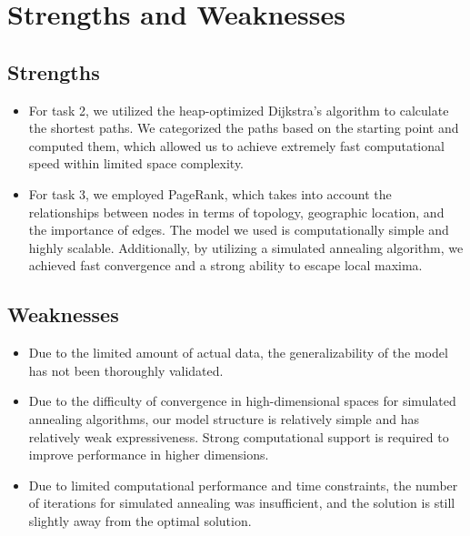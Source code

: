 \section{Strengths and Weaknesses}
\subsection{Strengths}
\begin{itemize}
    \item For task 2, we utilized the heap-optimized Dijkstra's algorithm to calculate the shortest paths. We categorized the paths based on the starting point and computed them, which allowed us to achieve extremely fast computational speed within limited space complexity.
    \item For task 3, we employed PageRank, which takes into account the relationships between nodes in terms of topology, geographic location, and the importance of edges. The model we used is computationally simple and highly scalable. Additionally, by utilizing a simulated annealing algorithm, we achieved fast convergence and a strong ability to escape local maxima.
\end{itemize}
\subsection{Weaknesses}
\begin{itemize}
    \item Due to the limited amount of actual data, the generalizability of the model has not been thoroughly validated.
    \item Due to the difficulty of convergence in high-dimensional spaces for simulated annealing algorithms, our model structure is relatively simple and has relatively weak expressiveness. Strong computational support is required to improve performance in higher dimensions.
    \item Due to limited computational performance and time constraints, the number of iterations for simulated annealing was insufficient, and the solution is still slightly away from the optimal solution.
\end{itemize}
